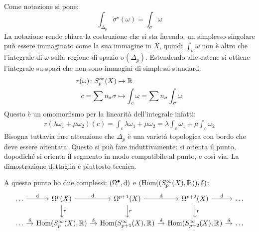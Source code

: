 Come notazione si pone:
\[
  \int_{\Delta_p} \sigma^\star(\omega) = \int_\sigma \omega
\]
La notazione rende chiara la costruzione che si sta facendo: un simplesso
singolare può essere immaginato come la sua immagine in $ X $, quindi
$ \int_\sigma \omega $ non è altro che l'integrale di $ \omega $ sulla regione di spazio
$ \sigma(\Delta_p) $. Estendendo alle catene si ottiene l'integrale su spazi che
non sono immagini di simplessi standard:
\begin{align*}
  r(\omega) \colon S_p^\infty(X) & \to \mathbb{R}^{} \\
  c = \sum n_\sigma \sigma & \mapsto \int_c \omega = \sum n_\sigma \int_\sigma \omega
\end{align*}
Questo è un omomorfismo per la linearità dell'integrale infatti:
\begin{gather*}
  r(\lambda \omega_1 + \mu \omega_2)(c) = \int_c \lambda \omega_1 + \mu \omega_2 = \lambda \int_c \omega_1 + \mu \int_c \omega_2
\end{gather*}
Bisogna tuttavia fare attenzione che $ \Delta_p $ è una varietà topologica con bordo
che deve essere orientata. Questo si può fare induttivamente: si orienta il
punto, dopodiché si orienta il segmento in modo compatibile al punto, e così
via. La dimostrazione dettaglia è piuttosto tecnica.

A questo punto ho due complessi: $ (\Omega^\bullet, \operatorname{d}\!{}) $ e $ (\mathrm{Hom}( (S^\infty_p(X), \mathbb{R}^{})), \delta) $:
\[
  \begin{tikzcd}[nodes = {column sep = 10 pt}]
    \dots \rar{\d{}} & \Omega^p(X) \dar{r} \rar{\d{}} & \Omega^{p+1}(X)  \dar{r} \rar{\d{}} & \Omega^{p+2}(X)  \dar{r} \rar{\d{}} & \dots \\
    \dots \rar{\delta} & \hom{S^\infty_p(X), \RN{}} \rar{\delta} & \hom{S^\infty_{p+1}(X), \RN{}} \rar{\delta} &\hom{S^\infty_{p+2}(X), \RN{}} \rar{\delta} & \dots
  \end{tikzcd}
\]

